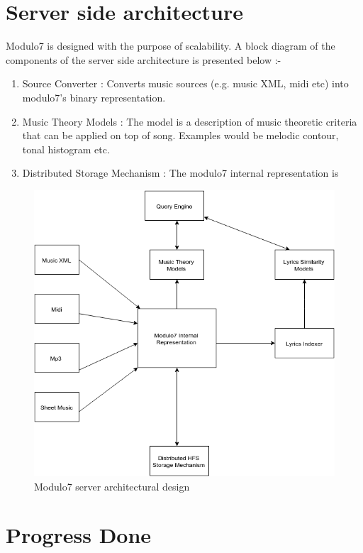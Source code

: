 \chapter{Server side architecture}
Modulo7 is designed with the purpose of scalability. A block diagram of the components of the server side architecture is presented below :-
\begin{enumerate}
\item Source Converter : Converts music sources (e.g. music XML, midi etc) into modulo7's binary representation.
\item Music Theory Models : The model is a description of music theoretic criteria that can be applied on top of song. Examples would be melodic contour, tonal histogram etc. 
\item Distributed Storage Mechanism : The modulo7 internal representation is 
\end{enumerate}

\begin{figure}[t]
\centering
\includegraphics[width=\textwidth]{Modulo7ServerDesign.png}
\makeatletter
\let\@currsize\normalsize
\caption{Modulo7 server architectural design}
\label{fig:figure}
\end{figure}

\chapter{Progress Done}
